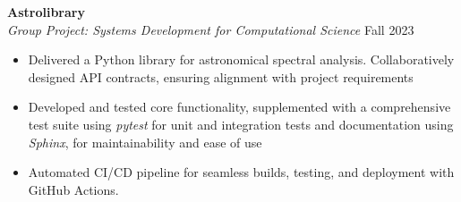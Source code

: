 \documentclass[11pt,a4paper]{article}
\newcommand{\subheading}[1]{\textbf{#1}}
\newcommand{\daterange}[1]{\hfill{#1}}
\begin{document}
\subheading{Astrolibrary} \\
\textit{Group Project: Systems Development for Computational Science} \daterange{Fall 2023}
\begin{itemize}[leftmargin=*,nosep]
    \item Delivered a Python library for astronomical spectral analysis. Collaboratively designed API contracts, ensuring alignment with project requirements
    \item Developed and tested core functionality, supplemented with a comprehensive test suite using \textit{pytest} for unit and integration tests and documentation using \textit{Sphinx}, for maintainability and ease of use
    \item Automated CI/CD pipeline for seamless builds, testing, and deployment with GitHub Actions.
\end{itemize}
\end{document}
